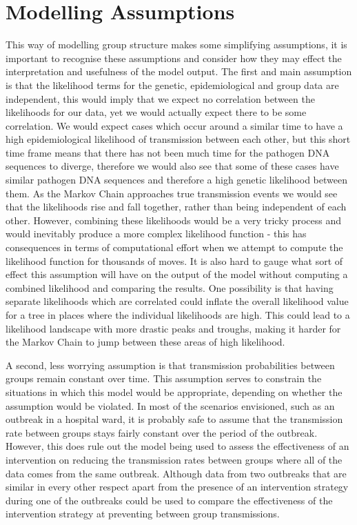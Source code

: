 \documentclass[11pt,a4paper]{report}
\begin{document}
\section{Modelling Assumptions}
This way of modelling group structure makes some simplifying assumptions, it is important to recognise these assumptions and consider how they may effect the interpretation and usefulness of the model output. The first and main assumption is that the likelihood terms for the genetic, epidemiological and group data are independent, this would imply that we expect no correlation between the likelihoods for our data, yet we would actually expect there to be some correlation. We would expect cases which occur around a similar time to have a high epidemiological likelihood of transmission between each other, but this short time frame means that there has not been much time for the pathogen DNA sequences to diverge, therefore we would also see that some of these cases have similar pathogen DNA sequences and therefore a high genetic likelihood between them. As the Markov Chain approaches true transmission events we would see that the likelihoods rise and fall together, rather than being independent of each other. However, combining these likelihoods would be a very tricky process and would inevitably produce a more complex likelihood function - this has consequences in terms of computational effort when we attempt to compute the likelihood function for thousands of moves. It is also hard to gauge what sort of effect this assumption will have on the output of the model without computing a combined likelihood and comparing the results. One possibility is that having separate likelihoods which are correlated could inflate the overall likelihood value for a tree in places where the individual likelihoods are high. This could lead to a likelihood landscape with more drastic peaks and troughs, making it harder for the Markov Chain to jump between these areas of high likelihood.

A second, less worrying assumption is that transmission probabilities between groups remain constant over time. This assumption serves to constrain the situations in which this model would be appropriate, depending on whether the assumption would be violated. In most of the scenarios envisioned, such as an outbreak in a hospital ward, it is probably safe to assume that the transmission rate between groups stays fairly constant over the period of the outbreak. However, this does rule out the model being used to assess the effectiveness of an intervention on reducing the transmission rates between groups where all of the data comes from the same outbreak. Although data from two outbreaks that are similar in every other respect apart from the presence of an intervention strategy during one of the outbreaks could be used to compare the effectiveness of the intervention strategy at preventing between group transmissions.
\end{document}
